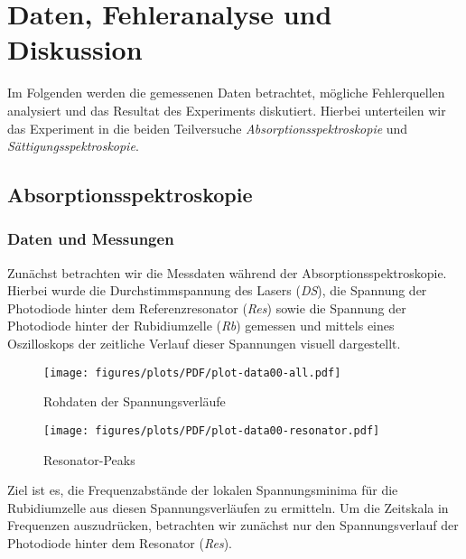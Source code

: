\chapter{Daten, Fehleranalyse und Diskussion}
\label{chap:data-error-analysis-and-discussion}

Im Folgenden werden die gemessenen Daten betrachtet, mögliche Fehlerquellen analysiert und das Resultat des Experiments diskutiert. Hierbei unterteilen wir das Experiment in die beiden Teilversuche \textit{Absorptionsspektroskopie} und \textit{Sättigungsspektroskopie}.

\section{Absorptionsspektroskopie}
\label{sec:absorption}

\subsection{Daten und Messungen}

Zunächst betrachten wir die Messdaten während der Absorptionsspektroskopie.
Hierbei wurde die Durchstimmspannung des Lasers (\textit{DS}), die Spannung der Photodiode hinter dem Referenzresonator (\textit{Res}) sowie die Spannung der Photodiode hinter der Rubidiumzelle (\textit{Rb}) gemessen und mittels eines Oszilloskops der zeitliche Verlauf dieser Spannungen visuell dargestellt.
\begin{figure}[H]
    \begin{minipage}{8cm}
        \centering
        \texttt{[image: figures/plots/PDF/plot-data00-all.pdf]}
        \caption{ Rohdaten der Spannungsverläufe}
        \label{fig:plot-data00-all}
    \end{minipage}
    \hfill
    \begin{minipage}{8cm}
        \centering
        \texttt{[image: figures/plots/PDF/plot-data00-resonator.pdf]}
        \caption{Resonator-Peaks }
        \label{fig:plot-data00-resonator}
\end{minipage}
\end{figure}
\noindent Ziel ist es, die Frequenzabstände der lokalen Spannungsminima für die Rubidiumzelle aus diesen Spannungsverläufen zu ermitteln.
Um die Zeitskala in Frequenzen auszudrücken, betrachten wir zunächst nur den Spannungsverlauf der Photodiode hinter dem Resonator (\textit{Res}).


